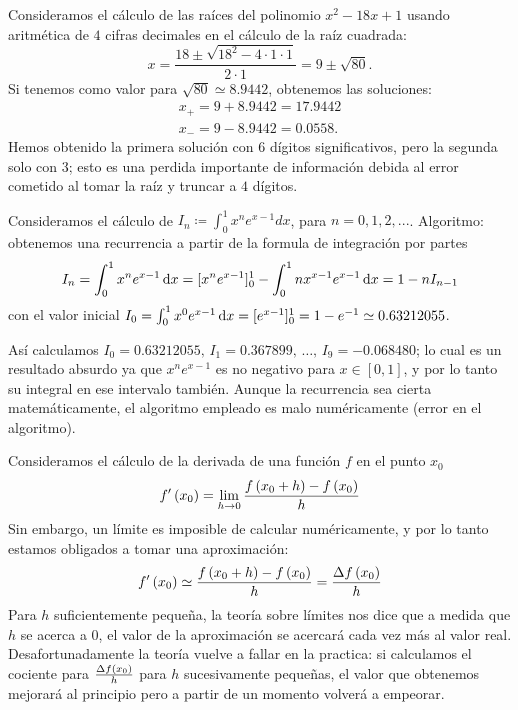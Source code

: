 \begin{example}\label{ej:2_errores}
    Consideramos el cálculo de las raíces del polinomio $x^2 - 18x +1$ usando aritmética de $4$ cifras decimales en el cálculo de la raíz cuadrada:  %
    \[
            x = \dfrac{18 \pm \sqrt{18^2 - 4 \cdot 1 \cdot 1}}{2 \cdot 1} = 9 \pm \sqrt{80} \nonumber.
    \]
    Si tenemos como valor para $\sqrt{80} \simeq 8.9442$, obtenemos las soluciones:
    \begin{gather*}
            x_{+}=9+8.9442=17.9442 \\
            x_{-}=9-8.9442=0.0558.
    \end{gather*}
    Hemos obtenido la primera solución con $6$ dígitos significativos, pero la segunda solo con $3$; esto es una perdida importante de información debida al error cometido al tomar la raíz y truncar a $4$ dígitos.
\end{example}

\begin{example}\label{ej:3_errores}
    Consideramos el cálculo de $I_n \coloneqq \int_{0}^{1}x^ne^{x-1}dx$, para $n = 0,1,2,...$.
    Algoritmo: obtenemos una recurrencia a partir de la formula de integración por partes
    \[
            I_n = \int_{0}^{1}x^ne^{x-1}\dif x = [x^ne^{x-1}]_{0}^{1} - \int_{0}^{1}nx^{x-1}e^{x-1}\dif x = 1 - nI_{n-1} \nonumber
    \]
    con el valor inicial $I_0 = \int_{0}^{1}x^0e^{x-1}\dif x = [e^{x-1}]_{0}^{1} = 1 - e^{-1} \simeq 0.63212055$.
    
    Así calculamos $I_0 = 0.63212055,\, I_1 = 0.367899,\, \dots,\, I_9 = -0.068480$; lo cual es un resultado absurdo ya que $x^ne^{x-1}$ es no negativo para $x \in [0,1]$, y por lo tanto su integral en ese intervalo también. Aunque la recurrencia sea cierta matemáticamente, el algoritmo empleado es malo numéricamente (error en el algoritmo).
\end{example}

\begin{example}\label{ej:4_errores}
    Consideramos el cálculo de la derivada de una función $f$ en el punto $x_0$
    \[
            f'\left( x_0\right)  = \lim\limits_{h \rightarrow 0} \dfrac{f\left( x_0 + h\right)  - f\left( x_0\right) }{h} \nonumber
    \]
    Sin embargo, un límite es imposible de calcular numéricamente, y por lo tanto estamos obligados a tomar una aproximación:
    \[
            f'\left( x_0\right)  \simeq \dfrac{f\left( x_0 + h\right)  - f\left( x_0\right) }{h} = \frac{\Delta f\left( x_0\right) }{h} \nonumber
    \]
    Para $h$ suficientemente pequeña, la teoría sobre límites nos dice que a medida que $h$ se acerca a $0$, el valor de la aproximación se acercará cada vez más al valor real. Desafortunadamente la teoría vuelve a fallar en la practica: si calculamos el cociente para $\frac{\Delta f\left( x_0\right) }{h}$ para $h$ sucesivamente pequeñas, el valor que obtenemos mejorará al principio pero a partir de un momento volverá a empeorar. 
\end{example}
    
